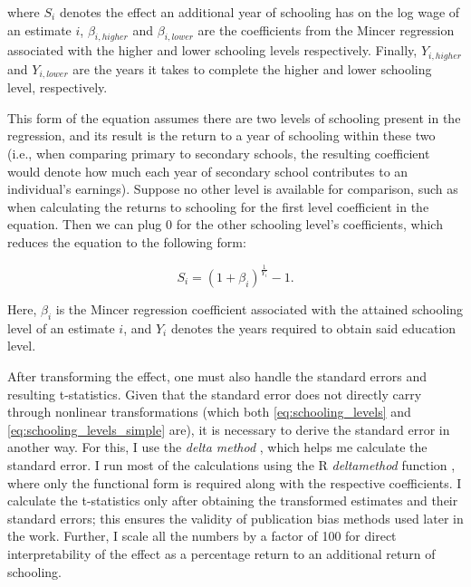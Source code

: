 where $S_i$ denotes the effect an additional year of schooling has on the log wage of an estimate $i$, $\beta_{i, higher}$ and $\beta_{i, lower}$ are the coefficients from the Mincer regression associated with the higher and lower schooling levels respectively. Finally, $Y_{i,higher}$ and $Y_{i,lower}$ are the years it takes to complete the higher and lower schooling level, respectively.

This form of the equation assumes there are two levels of schooling present in the regression, and its result is the return to a year of schooling within these two (i.e., when comparing primary to secondary schools, the resulting coefficient would denote how much each year of secondary school contributes to an individual's earnings). Suppose no other level is available for comparison, such as when calculating the returns to schooling for the first level coefficient in the equation. Then we can plug 0 for the other schooling level's coefficients, which reduces the equation to the following form:

\begin{equation}
    \label{eq:schooling_levels_simple}
    S_i = \left(1 + \beta_i\right)^{\frac{1}{Y_i}} - 1.
\end{equation}

Here, $\beta_i$ is the Mincer regression coefficient associated with the attained schooling level of an estimate $i$, and $Y_i$ denotes the years required to obtain said education level.

After transforming the effect, one must also handle the standard errors and resulting t-statistics. Given that the standard error does not directly carry through nonlinear transformations (which both \autoref{eq:schooling_levels} and \autoref{eq:schooling_levels_simple} are), it is necessary to derive the standard error in another way. For this, I use the \textit{delta method} \citep{ziegel2002statistical}, which helps me calculate the standard error. I run most of the calculations using the R \textit{deltamethod} function \citep{fox2018r}, where only the functional form is required along with the respective coefficients. I calculate the t-statistics only after obtaining the transformed estimates and their standard errors; this ensures the validity of publication bias methods used later in the work. Further, I scale all the numbers by a factor of 100 for direct interpretability of the effect as a percentage return to an additional return of schooling.

